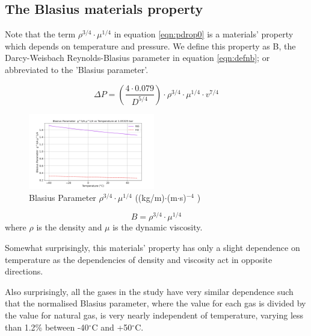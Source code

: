 \documentclass[5p]{elsarticle} %
\begin{document}
\subsection{The Blasius materials property}
\label{sec:blasiusparam}

Note that the term $\rho^{3/4} \cdot \mu^{1/4}$ in equation \eqref{eqn:pdrop0} is a materials' property which depends on temperature and pressure. We define this property as B, the Darcy-Weisbach Reynolds-Blasius parameter in equation \eqref{eqn:defnb}; or abbreviated to the 'Blasius parameter'.

\begin{equation}
\label{eqn:pdrop0}
\Delta P = \left ( \frac{4 \cdot 0.079}{D^{5/4}}\right ) \cdot \rho^{3/4} \cdot \mu^{1/4} \cdot v^{7/4}
\end{equation}

\begin{figure}[htb]
\centering
\includegraphics[width=0.49\textwidth]{peng_bf.png}
\caption{Blasius Parameter $\rho^{3/4} \cdot \mu^{1/4}$ ((kg/m)$\cdot$(m$\cdot$s)$^{-4}$ )}
\label{fig:blasiusparam0}
\end{figure}

\begin{equation}
\label{eqn:defnb}
B = \rho^{3/4} \cdot \mu^{1/4} 
\end{equation}
where $\rho$ is the density and $\mu$ is the dynamic viscosity.

Somewhat surprisingly, this materials' property has only a slight dependence on temperature as the dependencies of density and viscosity act in opposite directions. 

Also surprisingly, all the gases in the study have very similar dependence such that the normalised Blasius parameter, where the value for each gas is divided by the value for natural gas, is very nearly independent of temperature, varying less than 1.2\% between -40$^\circ$C and +50$^\circ$C.

\end{document}
